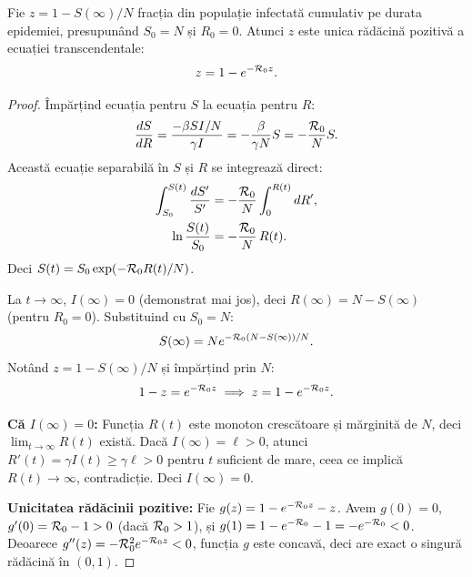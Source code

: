 \begin{teorema}
\label{thm:final_size}
Fie $z = 1 - S(\infty)/N$ fracția din populație infectată cumulativ pe durata
epidemiei, presupunând $S_0 = N$ și $R_0 = 0$. Atunci $z$ este unica rădăcină
pozitivă a ecuației transcendentale:
\begin{equation}
\label{eq:final_size}
    z = 1 - e^{-\mathcal{R}_0 z}.
\end{equation}
\end{teorema}

\begin{proof}
Împărțind ecuația pentru $S$ la ecuația pentru $R$:
\begin{equation}
    \frac{dS}{dR} = \frac{-\beta SI/N}{\gamma I} = -\frac{\beta}{\gamma N} S = -\frac{\mathcal{R}_0}{N} S.
\end{equation}
Această ecuație separabilă în $S$ și $R$ se integrează direct:
\begin{align}
    \int_{S_0}^{S(t)} \frac{dS'}{S'}
        &= -\frac{\mathcal{R}_0}{N}\int_0^{R(t)} dR', \\
    \ln\frac{S(t)}{S_0} &= -\frac{\mathcal{R}_0}{N}\, R(t).
\end{align}
Deci $S(t) = S_0 \exp\!\left(-\mathcal{R}_0 R(t)/N\right)$.

La $t \to \infty$, $I(\infty) = 0$ (demonstrat mai jos), deci $R(\infty) = N - S(\infty)$
(pentru $R_0 = 0$). Substituind cu $S_0 = N$:
\begin{equation}
    S(\infty) = N e^{-\mathcal{R}_0(N - S(\infty))/N}.
\end{equation}
Notând $z = 1 - S(\infty)/N$ și împărțind prin $N$:
\begin{equation}
    1 - z = e^{-\mathcal{R}_0 z} \implies z = 1 - e^{-\mathcal{R}_0 z}.
\end{equation}

\textbf{Că $I(\infty) = 0$:} Funcția $R(t)$ este monoton crescătoare și mărginită
de $N$, deci $\lim_{t\to\infty}R(t)$ există. Dacă $I(\infty) = \ell > 0$, atunci
$R'(t) = \gamma I(t) \geq \gamma\ell > 0$ pentru $t$ suficient de mare, ceea ce
implică $R(t) \to \infty$, contradicție. Deci $I(\infty) = 0$.

\textbf{Unicitatea rădăcinii pozitive:} Fie $g(z) = 1 - e^{-\mathcal{R}_0 z} - z$.
Avem $g(0) = 0$, $g'(0) = \mathcal{R}_0 - 1 > 0$ (dacă $\mathcal{R}_0 > 1$), și
$g(1) = 1 - e^{-\mathcal{R}_0} - 1 = -e^{-\mathcal{R}_0} < 0$. Deoarece $g''(z) = -\mathcal{R}_0^2
e^{-\mathcal{R}_0 z} < 0$, funcția $g$ este concavă, deci are exact o singură rădăcină
în $(0,1)$.
\end{proof}

